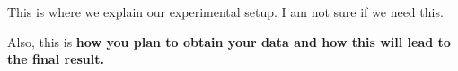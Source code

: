 This is where we explain our experimental setup. I am not sure if we need this.

Also, this is \textbf{how you plan to obtain your data and how this will lead to the final result.} 
